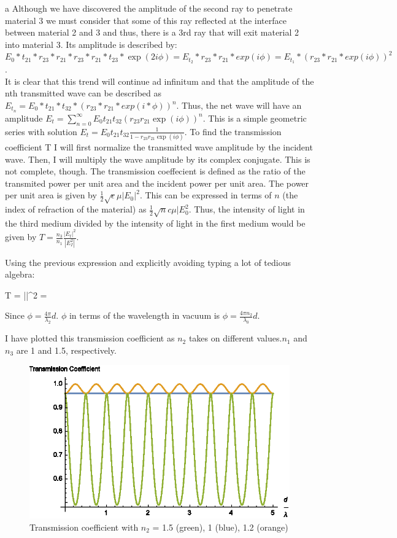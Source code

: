 \begin{homeworkProblem}
\begin{homeworkSection}{a}
Although we have discovered the amplitude of the second ray to penetrate material 3 we must consider that some of this ray reflected at the interface between material 2 and 3 and thus, there is a 3rd ray that will exit material 2 into material 3. Its amplitude is described by: $E_0*t_{21}*r_{23}*r_{21}*r_{23}*r_{21}*t_{23}*\exp(2 i\phi) = E_{t_2}*r_{23}*r_{21}*exp(i\phi) = E_{t_1}* (r_{23}*r_{21}*exp(i\phi))^2$.
\\

It is clear that this trend will continue ad infinitum and that the amplitude of the nth transmitted wave can be described as $E_{t_n} = E_0*t_{21}*t_{32}*(r_{23}*r_{21}*exp(i*\phi))^n$. Thus, the net wave will have an amplitude $E_t = \sum\limits_{n=0}^\infty E_0 t_{21} t_{32} (r_{23}r_{21}\exp(i\phi))^n$. This is a simple geometric series with solution $E_t = E_0 t_{21} t_{32} \frac{1}{1-r_{23}r_{21}\exp(i\phi)}$. To find the transmission coefficient T I will first normalize the transmitted wave amplitude by the incident wave. Then, I will multiply the wave amplitude by its complex conjugate. This is not complete, though. The transmission coeffecient is defined as the ratio of the transmited power per unit area and the incident power per unit area. The power per unit area is given by $\frac{1}{2}\sqrt{\epsilon}{\mu}|E_0|^2$. This can be expressed in terms of $n$ (the index of refraction of the material) as $\frac{1}{2} \sqrt{n}{c\mu}|E_0^2$. Thus, the intensity of light in the third medium divided by the intensity of light in the first medium would be given by $T = \frac{n_3}{n_1} \frac{|E_t|^2}{|E_I^2|}$.

Using the previous expression and explicitly avoiding typing a lot of tedious algebra: 

\begin{problemAnswer}{
T = ||^2 = }
\end{problemAnswer}

Since $\phi = \frac{4\pi}{\lambda_2}d$. $\phi$ in terms of the wavelength in vacuum is $\phi = \frac{4\pi n_2}{\lambda_0}d$.

I have plotted this transmission coefficient as $n_2$ takes on different values.$n_1$ and $n_3$ are 1 and 1.5, respectively.

\begin{figure}
  \centering\includegraphics[width=.5\textwidth]{Images/TransCoef.eps}
  \caption{Transmission coefficient with $n_2$ = 1.5 (green), 1 (blue), 1.2 (orange) }
\end{figure}
\end{homeworkSection}


\end{homeworkProblem}

